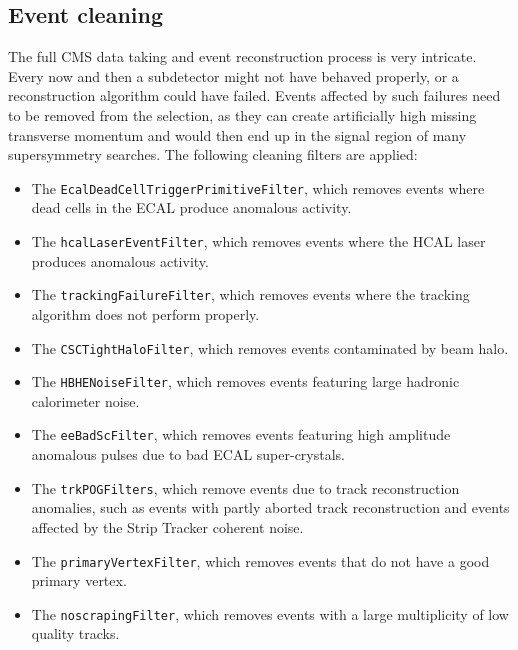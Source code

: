 



\subsection{Event cleaning \label{sec:event_cleaning}}

The full CMS data taking and event reconstruction process is very intricate. Every now and then a
subdetector might not have behaved properly, or a reconstruction algorithm could have failed. 
Events affected by such failures need to be removed from the selection, as they can create
artificially high missing transverse momentum and would then end up in the signal region of many
supersymmetry searches. 
The following cleaning filters are applied:

\begin{itemize}
\item The {\tt EcalDeadCellTriggerPrimitiveFilter}, which removes events where dead cells in the
ECAL produce anomalous activity.
\item The {\tt hcalLaserEventFilter}, which removes events where the HCAL laser produces anomalous
activity.
\item The {\tt trackingFailureFilter}, which removes events where the tracking algorithm does not
perform properly.
\item The {\tt CSCTightHaloFilter}, which removes events contaminated by beam halo.
\item The {\tt HBHENoiseFilter}, which removes events featuring large hadronic calorimeter noise.
\item The {\tt eeBadScFilter}, which removes events featuring high amplitude ano\-malous pulses due
to bad ECAL super-crystals.
\item The {\tt trkPOGFilters}, which remove events due to track reconstruction anomalies, such as
events with partly aborted track reconstruction and events affected by the Strip Tracker coherent
noise.
\item The {\tt primaryVertexFilter}, which removes events that do not have a good primary vertex.
\item The {\tt noscrapingFilter}, which removes events with a large multiplicity of low quality
tracks.
\end{itemize}

